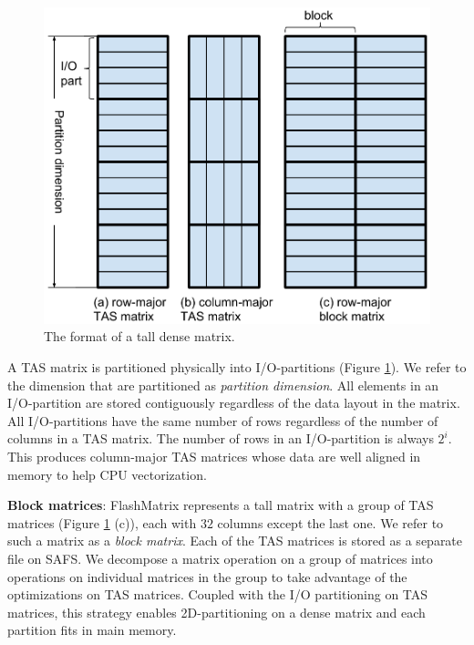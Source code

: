 \begin{figure}
	\centering
	\includegraphics[scale=0.5]{FlashMatrix_figs/dense_matrix2.pdf}
	\caption{The format of a tall dense matrix.}
	\label{fig:den_mat}
\end{figure}

A TAS matrix is partitioned physically into I/O-partitions (Figure
\ref{fig:den_mat}). We refer to the dimension that are partitioned as
\textit{partition dimension}. All elements in an I/O-partition are stored
contiguously regardless of the data layout in the matrix. All 
I/O-partitions have the same number of rows regardless of
the number of columns in a TAS matrix. The number of rows in
an I/O-partition is always $2^i$. This produces column-major TAS
matrices whose data are well aligned in memory to help CPU vectorization.

\noindent \textbf{Block matrices}:
FlashMatrix represents a tall matrix with a group of TAS matrices (Figure
\ref{fig:den_mat} (c)), each with $32$ columns except the last one. We refer
to such a matrix as a \textit{block matrix}. Each of the TAS matrices is
stored as a separate file on SAFS. We decompose a matrix operation
on a group of matrices into operations on individual matrices in the group
to take advantage of the optimizations on TAS matrices.
Coupled with the I/O partitioning on TAS matrices, this strategy enables
2D-partitioning on a dense matrix and each partition fits in main memory.

